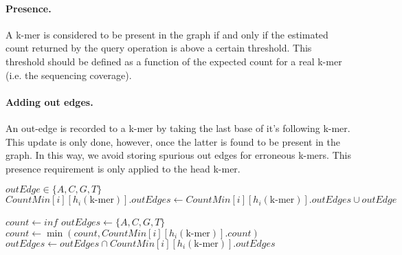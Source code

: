 \paragraph{Presence.} A k-mer is considered to be present in the graph if and only if the estimated count returned by the query operation
is above a certain threshold. This threshold should be defined as a function of the expected count for a real k-mer (i.e. the sequencing coverage).

\paragraph{Adding out edges.} An out-edge is recorded to a k-mer by taking the last base of it's following k-mer. This update is only done,
however, once the latter is found to be present in the graph. In this way, we avoid storing spurious out edges for erroneous k-mers.
This presence requirement is only applied to the head k-mer.

\begin{algorithm}
    \caption{$\mathit{addOutEdge}(\text{k-mer}, \mathit{outEdge})$}\label{alg:addOutEdge}
    \begin{algorithmic}
        \Ensure $\mathit{outEdge} \in \{A, C, G, T\}$
            \State $\mathit{CountMin}[i][h_i(\text{k-mer})].\mathit{outEdges} \gets \mathit{CountMin}[i][h_i(\text{k-mer})].\mathit{outEdges} \cup \mathit{outEdge}$
        \EndFor
    \end{algorithmic}
\end{algorithm}

\begin{algorithm}
    \caption{$\mathit{query}(\text{k-mer})$}\label{alg:query}
    \begin{algorithmic}
        \State $\mathit{count} \gets \mathit{inf}$
        \State $\mathit{outEdges} \gets \{A, C, G, T\}$
            \State $\mathit{count} \gets \min(\mathit{count}, \mathit{CountMin}[i][h_i(\text{k-mer})].\mathit{count})$
            \State $\mathit{outEdges} \gets \mathit{outEdges} \cap \mathit{CountMin}[i][h_i(\text{k-mer})].\mathit{outEdges}$
        \EndFor
    \end{algorithmic}
\end{algorithm}